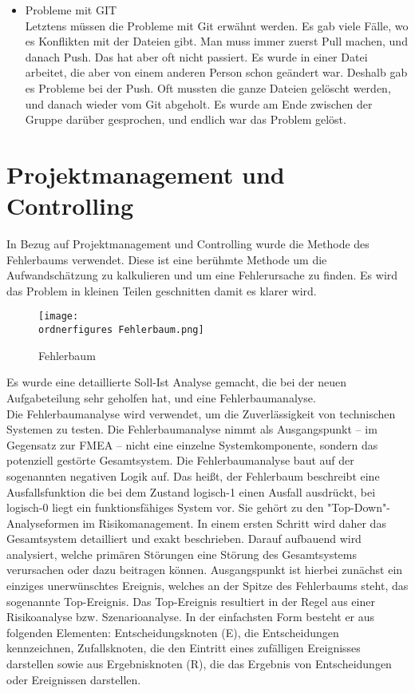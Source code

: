 \begin{itemize}
		\item Probleme mit GIT \\
		
		Letztens müssen die Probleme mit Git erwähnt werden. Es gab viele Fälle, wo es Konflikten mit der Dateien gibt. Man muss immer zuerst Pull machen, und danach Push. Das hat aber oft nicht passiert. Es wurde in einer Datei arbeitet, die aber von einem anderen Person schon geändert war. Deshalb gab es Probleme bei der Push. Oft mussten die ganze Dateien gelöscht werden, und danach wieder vom Git abgeholt. Es wurde am Ende zwischen der Gruppe darüber gesprochen, und endlich war das Problem gelöst.
	\end{itemize}

	\section{Projektmanagement und Controlling}
	In Bezug auf Projektmanagement und Controlling wurde die Methode des Fehlerbaums verwendet. Diese ist eine ber{\"u}hmte Methode um die Aufwandsch{\"a}tzung zu kalkulieren und um eine Fehlerursache zu finden. Es wird das Problem in kleinen Teilen geschnitten damit es klarer wird. 
	\begin{figure}		
		\texttt{[image: \\ordnerfigures Fehlerbaum.png]}
		\caption{Fehlerbaum}
		\label{fig:Fehlerbaum}
	\end{figure}
	Es wurde eine detaillierte Soll-Ist Analyse gemacht, die bei der neuen Aufgabeteilung sehr geholfen hat, und eine Fehlerbaumanalyse.\\
	
	Die Fehlerbaumanalyse wird verwendet, um die Zuverlässigkeit von technischen Systemen zu testen. Die Fehlerbaumanalyse nimmt als Ausgangspunkt – im Gegensatz zur FMEA – nicht eine einzelne Systemkomponente, sondern das potenziell gestörte Gesamtsystem. Die Fehlerbaumanalyse baut auf der sogenannten negativen Logik auf. Das heißt, der Fehlerbaum beschreibt eine Ausfallsfunktion die bei dem Zustand logisch-1 einen Ausfall ausdrückt, bei logisch-0 liegt ein funktionsfähiges System vor.
	Sie gehört zu den "Top-Down"-Analyseformen im Risikomanagement. In einem ersten Schritt wird daher das Gesamtsystem detailliert und exakt beschrieben. Darauf aufbauend wird analysiert, welche primären Störungen eine Störung des Gesamtsystems verursachen oder dazu beitragen können. Ausgangspunkt ist hierbei zunächst ein einziges unerwünschtes Ereignis, welches an der Spitze des Fehlerbaums steht, das sogenannte Top-Ereignis. Das Top-Ereignis resultiert in der Regel aus einer Risikoanalyse bzw. Szenarioanalyse.
	In der einfachsten Form besteht er aus folgenden Elementen: Entscheidungsknoten (E), die Entscheidungen kennzeichnen, Zufallsknoten, die den Eintritt eines zufälligen Ereignisses darstellen sowie aus Ergebnisknoten (R), die das Ergebnis von Entscheidungen oder Ereignissen darstellen.
	
